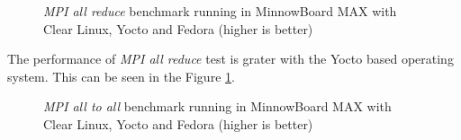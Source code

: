 \begin{figure}[H]
\begin{center}
\end{center}
\caption{\textit{MPI all reduce} benchmark running in  MinnowBoard MAX with Clear Linux,
Yocto and Fedora (higher is better)}
\label{mpi_allreduce_yocto}
\end{figure}

The performance of \textit{MPI all reduce} test is grater with the Yocto based
operating system. This can be seen in the Figure \ref{mpi_allreduce_yocto}.

\begin{figure}[H]
\begin{center}
\end{center}
\caption{\textit{MPI all to all} benchmark running in  MinnowBoard MAX with Clear Linux, Yocto
and Fedora (higher is better)}
\label{mpi_all_to_all_yocto}
\end{figure}

